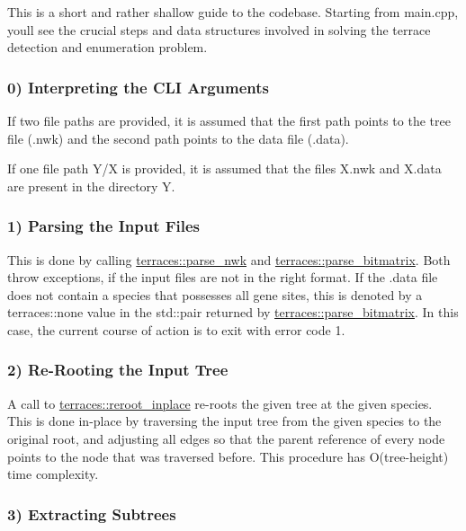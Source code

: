 This is a short and rather shallow guide to the codebase. Starting from main.\+cpp, you\textquotesingle{}ll see the crucial steps and data structures involved in solving the terrace detection and enumeration problem.

\subsubsection*{0) Interpreting the C\+LI Arguments}

If two file paths are provided, it is assumed that the first path points to the tree file (.nwk) and the second path points to the data file (.data).

If one file path Y/X is provided, it is assumed that the files X.\+nwk and X.\+data are present in the directory Y.

\subsubsection*{1) Parsing the Input Files}

This is done by calling \hyperlink{namespaceterraces_add61915a31828774ee0371d443031c29}{terraces\+::parse\+\_\+nwk} and \hyperlink{namespaceterraces_af52559863b67502f00d68853f50c69af}{terraces\+::parse\+\_\+bitmatrix}. Both throw exceptions, if the input files are not in the right format. If the .data file does not contain a species that possesses all gene sites, this is denoted by a terraces\+::none value in the std\+::pair returned by \hyperlink{namespaceterraces_af52559863b67502f00d68853f50c69af}{terraces\+::parse\+\_\+bitmatrix}. In this case, the current course of action is to exit with error code 1.

\subsubsection*{2) Re-\/\+Rooting the Input Tree}

A call to \hyperlink{namespaceterraces_ae8abab19d1c4a35eb187cd2cf005fe59}{terraces\+::reroot\+\_\+inplace} re-\/roots the given tree at the given species. This is done in-\/place by traversing the input tree from the given species to the original root, and adjusting all edges so that the parent reference of every node points to the node that was traversed before. This procedure has O(tree-\/height) time complexity.

\subsubsection*{3) Extracting Subtrees}

